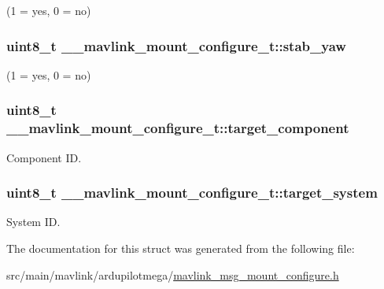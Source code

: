 (1 = yes, 0 = no) 

\hypertarget{struct____mavlink__mount__configure__t_a6cb35e89730214c425eb45d26b345783}{
\subsubsection[{stab\+\_\+yaw}]{\setlength{\rightskip}{0pt plus 5cm}uint8\+\_\+t \+\_\+\+\_\+mavlink\+\_\+mount\+\_\+configure\+\_\+t\+::stab\+\_\+yaw}}\label{struct____mavlink__mount__configure__t_a6cb35e89730214c425eb45d26b345783}


(1 = yes, 0 = no) 

\hypertarget{struct____mavlink__mount__configure__t_a30f5f09059b93600d2ef5579fa3305a0}{
\subsubsection[{target\+\_\+component}]{\setlength{\rightskip}{0pt plus 5cm}uint8\+\_\+t \+\_\+\+\_\+mavlink\+\_\+mount\+\_\+configure\+\_\+t\+::target\+\_\+component}}\label{struct____mavlink__mount__configure__t_a30f5f09059b93600d2ef5579fa3305a0}


Component I\+D. 

\hypertarget{struct____mavlink__mount__configure__t_a042d72066e81eccc6c32bc96d280a92a}{
\subsubsection[{target\+\_\+system}]{\setlength{\rightskip}{0pt plus 5cm}uint8\+\_\+t \+\_\+\+\_\+mavlink\+\_\+mount\+\_\+configure\+\_\+t\+::target\+\_\+system}}\label{struct____mavlink__mount__configure__t_a042d72066e81eccc6c32bc96d280a92a}


System I\+D. 



The documentation for this struct was generated from the following file\+:\begin{DoxyCompactItemize}
\item 
src/main/mavlink/ardupilotmega/\hyperlink{mavlink__msg__mount__configure_8h}{mavlink\+\_\+msg\+\_\+mount\+\_\+configure.\+h}\end{DoxyCompactItemize}
